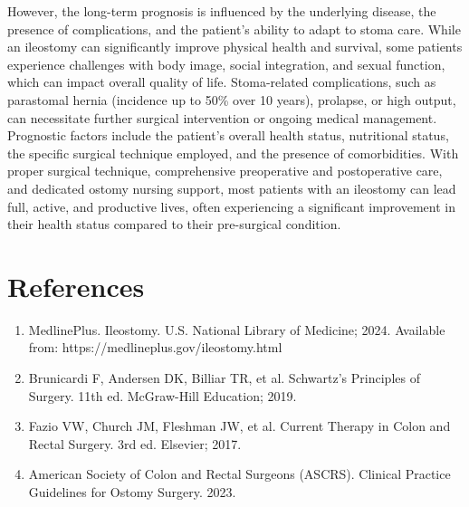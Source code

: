 However, the long-term prognosis is influenced by the underlying disease, the presence of complications, and the patient's ability to adapt to stoma care. While an ileostomy can significantly improve physical health and survival, some patients experience challenges with body image, social integration, and sexual function, which can impact overall quality of life. Stoma-related complications, such as parastomal hernia (incidence up to 50\% over 10 years), prolapse, or high output, can necessitate further surgical intervention or ongoing medical management. Prognostic factors include the patient's overall health status, nutritional status, the specific surgical technique employed, and the presence of comorbidities. With proper surgical technique, comprehensive preoperative and postoperative care, and dedicated ostomy nursing support, most patients with an ileostomy can lead full, active, and productive lives, often experiencing a significant improvement in their health status compared to their pre-surgical condition.

\section*{References}
\begin{enumerate}
  \item MedlinePlus. Ileostomy. U.S. National Library of Medicine; 2024. Available from: https://medlineplus.gov/ileostomy.html
  
  \item Brunicardi F, Andersen DK, Billiar TR, et al. Schwartz's Principles of Surgery. 11th ed. McGraw-Hill Education; 2019.
  
  \item Fazio VW, Church JM, Fleshman JW, et al. Current Therapy in Colon and Rectal Surgery. 3rd ed. Elsevier; 2017.
  
  \item American Society of Colon and Rectal Surgeons (ASCRS). Clinical Practice Guidelines for Ostomy Surgery. 2023.
\end{enumerate}

\clearpage
